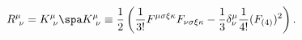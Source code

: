 \begin{equation}
\label{einsteqs}
R^\mu_{\ \nu} = K^\mu_{\ \nu} \spa
K^\mu_{\ \nu} \equiv \frac{1}{2} \left( \frac{1}{3!} 
F^{\mu \sigma \xi \kappa} F_{\nu \sigma \xi \kappa}
- \frac{1}{3} \delta^\mu_\nu \frac{1}{4!} (F_{(4)})^2 \right).
\end{equation}


